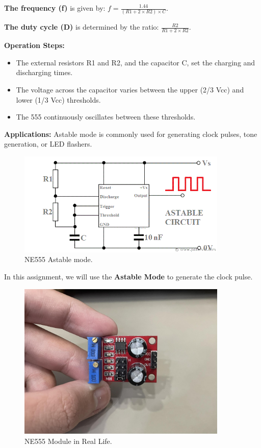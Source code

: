 \documentclass{article}
\begin{document}
\vspace{10pt}
\textbf{The frequency (f)} is given by: $f = \frac{1.44}{(R1 + 2 \times R2) \times C}$.\par
\textbf{The duty cycle (D)} is determined by the ratio: $\frac{R2}{R1 + 2 \times R2}$.\par

\vspace{10pt}
\textbf{Operation Steps:}
\begin{itemize}
    \item The external resistors R1 and R2, and the capacitor C, set the charging and discharging times.
    \item The voltage across the capacitor varies between the upper (2/3 Vcc) and lower (1/3 Vcc) thresholds.
    \item The 555 continuously oscillates between these thresholds.
\end{itemize}

\vspace{10pt}
\textbf{Applications:} Astable mode is commonly used for generating clock pulses, tone generation, or LED flashers.

\begin{figure}[h]
    \centering
    \includegraphics[width=10cm]{Pic/Pictures/555-timer-astable-circuit.png}
    \caption{NE555 Astable mode.}
    \label{fig:enter-label}
\end{figure}

In this assignment, we will use the \textbf{Astable Mode} to generate the clock pulse.

\begin{figure}[h]
    \centering
    \includegraphics[width=10cm]{Pic/Pictures/NE555 real.jpg}
    \caption{NE555 Module in Real Life.}
    \label{fig:enter-label}
\end{figure}
\newpage
\end{document}
